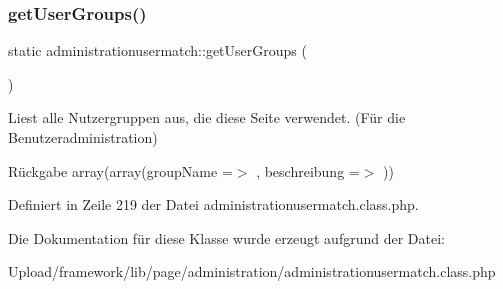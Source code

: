 \mbox{\label{classadministrationusermatch_abb4c2d07d60d09451fec0df1c5de6eef}} 
\subsubsection{\texorpdfstring{get\+User\+Groups()}{getUserGroups()}}
{\footnotesize\ttfamily static administrationusermatch\+::get\+User\+Groups (\begin{DoxyParamCaption}{ }\end{DoxyParamCaption})\hspace{0.3cm}{\ttfamily [static]}}

Liest alle Nutzergruppen aus, die diese Seite verwendet. (Für die Benutzeradministration) \begin{DoxyReturn}{Rückgabe}
array(array(\textquotesingle{}group\+Name\textquotesingle{} =$>$ \textquotesingle{}\textquotesingle{}, \textquotesingle{}beschreibung\textquotesingle{} =$>$ \textquotesingle{}\textquotesingle{})) 
\end{DoxyReturn}


Definiert in Zeile 219 der Datei administrationusermatch.\+class.\+php.



Die Dokumentation für diese Klasse wurde erzeugt aufgrund der Datei\+:\begin{DoxyCompactItemize}
\item 
Upload/framework/lib/page/administration/administrationusermatch.\+class.\+php\end{DoxyCompactItemize}

